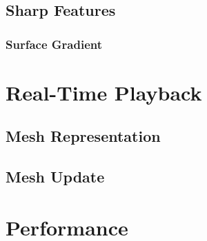 \documentclass{report}
\begin{document}
\section{Sharp Features}
\subsection{Surface Gradient}

\chapter{Real-Time Playback}
\section{Mesh Representation}
\section{Mesh Update}

\chapter{Performance}
\end{document}
